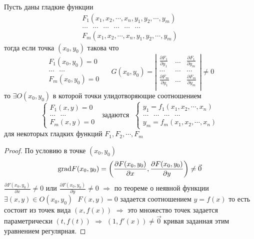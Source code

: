 \begin{theorem}
  Пусть  даны гладкие функции
  $$
  \begin{array}{c}
    F_1 (x_1, x_2, \cdots, x_n, y_1, y_2, \cdots, y_m) \\
    \dots ~~~ \dots ~~~ \dots ~~~ \dots  ~~~ \dots ~~~ \dots \\
    F_m (x_1, x_2, \cdots, x_n, y_1, y_2, \cdots, y_m)
  \end{array}
  $$
  тогда если точка $(x_0, y_0)$ такова что
  $$
  \begin{array}{c}
    F_1(x_0, y_0) = 0 \\
    \ldots ~~~ \ldots \\
    F_m(x_0, y_0) = 0 \\
  \end{array} ~~~~~~
  G(x_0, y_0) = \left|
  \begin{array}{ccc}
    \frac{\partial F_1}{\partial y_1} & \dots &
    \frac{\partial F_1}{\partial y_m} \\

    \dots & \dots & \dots \\

    \frac{\partial F_m}{\partial y_1} & \dots &
    \frac{\partial F_m}{\partial y_m} \\
  \end{array}
  \right|
  \not= 0
  $$
  то $\exists O(x_0, y_0)$ в которой точки улидотворяющие соотношением
  $$
  \left\{
  \begin{array}{c}
    F_1(x, y) = 0 \\
    \dots ~~~ \dots \\
    F_m(x, y) = 0
  \end{array}
  \right. ~~~ \text{задаются} ~~~
  \left\{
  \begin{array}{c}
    y_1 = f_1(x_1, x_2, \cdots, x_n)\\
    \dots ~~~ \dots ~~~ \dots ~~~ \dots \\
    y_m = f_m(x_1, x_2, \cdots, x_n)
  \end{array}
  \right.
  $$
  для некоторых гладких функций $F_1, F_2, \cdots, F_m $
\end{theorem}

\begin{proof}
  По условию в точке $(x_0, y_0)$
  $$
  \mathrm{grad} F(x_0, y_0) = \left( \frac{\partial F(x_0, y_0)}{\partial x},
  \frac{\partial F(x_0, y_0)}{\partial y} \right) \not= \vec 0
  $$
  $\frac{\partial F(x_0, y_0)}{\partial x} \not= 0$ или
  $\frac{\partial F(x_0, y_0)}{\partial y} \not= 0$ $\Rightarrow$
  по теореме о неявной функции $\exists (x, y) \in O(x_0, y_0) ~~~ F(x, y) = 0$
  задается соотношением $y = f(x)$
  то есть состоит из точек вида $(x, f(x))$ $\Rightarrow$ это множество точек
  задается параметрически $(t, f(t))$  $\Rightarrow$
  $(1, f'(x)) \not= \vec 0$ кривая заданная этим уравнением регулярная.
\end{proof}

